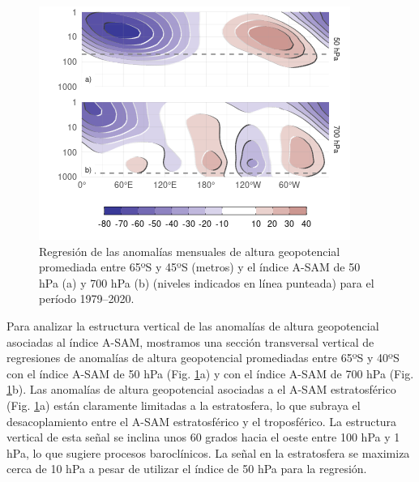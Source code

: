 \documentclass[12pt,oneside]{reedthesis}
\begin{document}
\begin{figure}
\includegraphics{figures/30-sam/vertical-regression-1} \caption{Regresión de las anomalías mensuales de altura geopotencial promediada entre 65ºS y 45ºS (metros) y el índice A-SAM de 50 hPa (a) y 700 hPa (b) (niveles indicados en línea punteada) para el período 1979--2020.}\label{fig:vertical-regression}
\end{figure}

Para analizar la estructura vertical de las anomalías de altura geopotencial asociadas al índice A-SAM, mostramos una sección transversal vertical de regresiones de anomalías de altura geopotencial promediadas entre 65ºS y 40ºS con el índice A-SAM de 50 hPa (Fig. \ref{fig:vertical-regression}a) y con el índice A-SAM de 700 hPa (Fig. \ref{fig:vertical-regression}b).
Las anomalías de altura geopotencial asociadas a el A-SAM estratosférico (Fig. \ref{fig:vertical-regression}a) están claramente limitadas a la estratosfera, lo que subraya el desacoplamiento entre el A-SAM estratosférico y el troposférico.
La estructura vertical de esta señal se inclina unos 60 grados hacia el oeste entre 100 hPa y 1 hPa, lo que sugiere procesos baroclínicos.
La señal en la estratosfera se maximiza cerca de 10 hPa a pesar de utilizar el índice de 50 hPa para la regresión.
\end{document}
